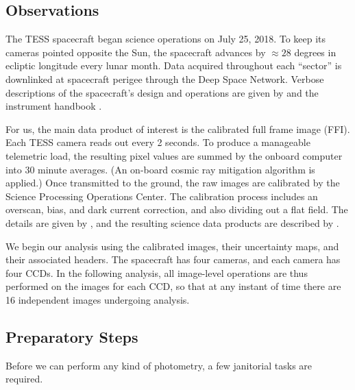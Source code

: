 \documentclass[12pt,twocolumn,tighten]{aastex62}
\begin{document}
\subsection{Observations}
\label{subsec:observations}


The TESS spacecraft began science operations on July 25, 2018.  To
keep its cameras pointed opposite the Sun, the spacecraft advances by
$\approx$$28$ degrees in ecliptic longitude every lunar month.  Data
acquired throughout each ``sector'' is downlinked at spacecraft
perigee through the Deep Space Network.  Verbose descriptions of the
spacecraft's design and operations are given by
\citet{ricker_transiting_2015} and the instrument handbook
\citep{vanderspek_2018}.

For us, the main data product of interest is the calibrated full frame
image (FFI).  Each TESS camera reads out every 2 seconds.  To produce
a manageable telemetric load, the resulting pixel values are summed by
the onboard computer into 30 minute averages. (An on-board cosmic ray
mitigation algorithm is applied.) Once transmitted to the ground, the
raw images are calibrated by the Science Processing Operations Center.
The calibration process includes an overscan, bias, and dark current
correction, and also dividing out a flat field.  The details are given by
\citet{clarke_kepler_2017}, and the resulting science data products are
described by \citet{tess_data_product_description_2018}.

We begin our analysis using the calibrated images, their uncertainty
maps, and their associated headers.  The spacecraft has four cameras,
and each camera has four CCDs.  In the following analysis, all
image-level operations are thus performed on the images for each CCD,
so that at any instant of time there are 16 independent images
undergoing analysis.


\subsection{Preparatory Steps}
\label{subsec:preparation}

Before we can perform any kind of photometry, a few janitorial tasks
are required.
\end{document}
